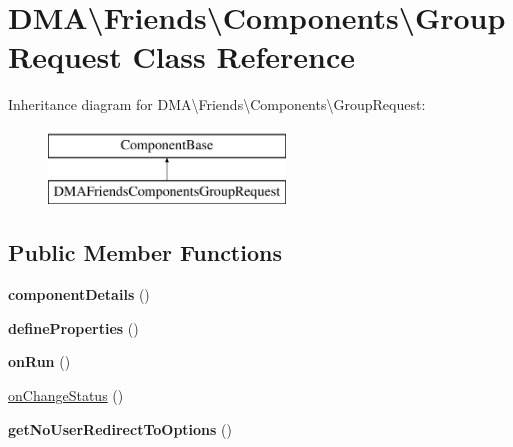 \hypertarget{classDMA_1_1Friends_1_1Components_1_1GroupRequest}{}\section{D\+M\+A\textbackslash{}Friends\textbackslash{}Components\textbackslash{}Group\+Request Class Reference}
\label{classDMA_1_1Friends_1_1Components_1_1GroupRequest}
Inheritance diagram for D\+M\+A\textbackslash{}Friends\textbackslash{}Components\textbackslash{}Group\+Request\+:\begin{figure}[H]
\begin{center}
\leavevmode
\includegraphics[height=2.000000cm]{d1/d29/classDMA_1_1Friends_1_1Components_1_1GroupRequest}
\end{center}
\end{figure}
\subsection*{Public Member Functions}
\begin{DoxyCompactItemize}
\item 
\hypertarget{classDMA_1_1Friends_1_1Components_1_1GroupRequest_afb7e37d55f101ec2dfea2af57f09b88d}{}{\bfseries component\+Details} ()\label{classDMA_1_1Friends_1_1Components_1_1GroupRequest_afb7e37d55f101ec2dfea2af57f09b88d}

\item 
\hypertarget{classDMA_1_1Friends_1_1Components_1_1GroupRequest_aa4deec2b8fa31ca4580b1eaf4ff40a4c}{}{\bfseries define\+Properties} ()\label{classDMA_1_1Friends_1_1Components_1_1GroupRequest_aa4deec2b8fa31ca4580b1eaf4ff40a4c}

\item 
\hypertarget{classDMA_1_1Friends_1_1Components_1_1GroupRequest_a78685da9fdb569d6a5a9e30304bb0d22}{}{\bfseries on\+Run} ()\label{classDMA_1_1Friends_1_1Components_1_1GroupRequest_a78685da9fdb569d6a5a9e30304bb0d22}

\item 
\hyperlink{classDMA_1_1Friends_1_1Components_1_1GroupRequest_a809f2ed08437eb0458240725f07d098c}{on\+Change\+Status} ()
\item 
\hypertarget{classDMA_1_1Friends_1_1Components_1_1GroupRequest_adcf888e148f475ac44f05d31060b3762}{}{\bfseries get\+No\+User\+Redirect\+To\+Options} ()\label{classDMA_1_1Friends_1_1Components_1_1GroupRequest_adcf888e148f475ac44f05d31060b3762}

\end{DoxyCompactItemize}
